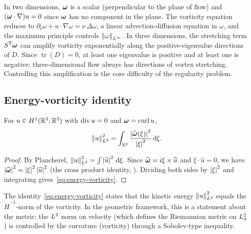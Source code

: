 \begin{remark}\label{rem:3d-stretching}
  In two dimensions, $\boldsymbol{\omega}$ is a scalar (perpendicular to the plane of flow) and
  $(\boldsymbol{\omega} \cdot \nabla)u = 0$ since $\boldsymbol{\omega}$ has no component in the plane.  The vorticity
  equation reduces to $\partial_t\omega + u \cdot \nabla\omega = \nu\,\Delta\omega$, a
  linear advection-diffusion equation in $\omega$, and the maximum principle controls
  $\left\lVert \omega \right\rVert_{L^{\infty}}$.  In three dimensions, the stretching term
  $S^{\mathsf{T}}\boldsymbol{\omega}$ can amplify vorticity exponentially along the
  positive-eigenvalue directions of $D$.  Since $\operatorname{tr}(D) = 0$, at least one
  eigenvalue is positive and at least one is negative: three-dimensional flow always has
  directions of vortex stretching.  Controlling this amplification is the core difficulty of
  the regularity problem.
\end{remark}

\subsection{Energy-vorticity identity}

\begin{proposition}\label{prop:energy-vorticity}
  For $u \in H^{1}(\mathbb{R}^3;\mathbb{R}^3)$ with $\operatorname{div} u = 0$ and
  $\boldsymbol{\omega} = \operatorname{curl} u$,
  \begin{equation}\label{eq:energy-vorticity}
    \left\lVert u \right\rVert_{L^{2}}^2
    = \int_{\mathbb{R}^3} \frac{\left\lvert \widehat{\boldsymbol{\omega}}(\xi) \right\rvert^2}{\left\lvert \xi \right\rvert^2}\,\mathrm{d}\xi.
  \end{equation}
\end{proposition}

\begin{proof}
  By Plancherel, $\left\lVert u \right\rVert_{L^{2}}^2 = \int\left\lvert \widehat{u} \right\rvert^2\,\mathrm{d}\xi$.  Since
  $\widehat{\boldsymbol{\omega}} = i\xi \times \widehat{u}$ and $\xi \cdot \widehat{u} = 0$, we have
  $\left\lvert \widehat{\boldsymbol{\omega}} \right\rvert^2 = \left\lvert \xi \right\rvert^2\left\lvert \widehat{u} \right\rvert^2$ (the cross product identity,
  ).  Dividing both sides by $\left\lvert \xi \right\rvert^2$ and integrating
  gives~\eqref{eq:energy-vorticity}.
\end{proof}

\begin{remark}
  The identity~\eqref{eq:energy-vorticity} states that the kinetic energy
  $\left\lVert u \right\rVert_{L^{2}}^2$ equals the $\dot{H}^{-1}$-norm of the vorticity.  In the
  geometric framework, this is a statement about the metric: the $L^{2}$ norm on
  velocity (which defines the Riemannian metric on $L^{2}_\sigma$) is controlled by the
  curvature (vorticity) through a Sobolev-type inequality.
\end{remark}

